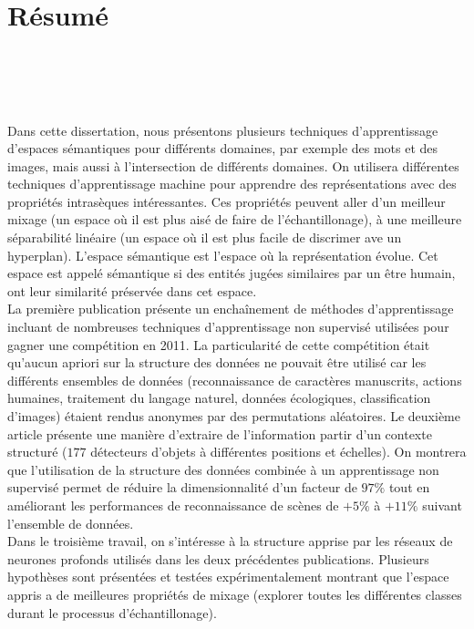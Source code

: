 \chapter*{R\'{e}sum\'{e}\\~~~~~~~~\\~~~~~~~~~~~}

\vspace{-2.8cm}

Dans cette dissertation, nous présentons plusieurs techniques d'apprentissage
d'espaces sémantiques pour différents domaines, par exemple des mots et des
images, mais aussi à l'intersection de différents domaines.  On utilisera
différentes techniques d'apprentissage machine pour apprendre des
représentations avec des propriétés intrasèques intéressantes. Ces propriétés
peuvent aller d'un meilleur mixage (un espace où il est plus aisé de faire de
l'échantillonage), à une meilleure séparabilité linéaire (un espace où il est
plus facile de discrimer ave un hyperplan). L'espace sémantique est l'espace où
la représentation évolue. Cet espace est appelé sémantique si des entités
jugées similaires par un être humain, ont leur similarité préservée dans cet
espace.
\\

\vspace{-0.2cm}
La première publication présente un enchaînement de méthodes d'apprentissage
incluant de nombreuses techniques d'apprentissage non supervisé utilisées pour
gagner une compétition en 2011. La particularité de cette compétition était
qu'aucun apriori sur la structure des données ne pouvait être utilisé car les
différents ensembles de données (reconnaissance de caractères manuscrits,
actions humaines, traitement du langage naturel, données écologiques,
classification d'images) étaient rendus anonymes par des permutations
aléatoires. Le deuxième article présente une manière d'extraire de l'information
partir d'un contexte structuré ($177$ détecteurs d'objets à différentes
positions et échelles). On montrera que l'utilisation de la structure des
données combinée à un apprentissage non supervisé permet de réduire la
dimensionnalité d'un facteur de $97\%$ tout en améliorant les performances de
reconnaissance de scènes de $+5\%$ à $+11\%$ suivant l'ensemble de données.
\\

\vspace{-0.2cm}
Dans le troisième travail, on s'intéresse à la structure apprise par les
réseaux de neurones profonds utilisés dans les deux précédentes publications.
Plusieurs hypothèses sont présentées et testées expérimentalement montrant que
l'espace appris a de meilleures propriétés de mixage (explorer toutes les
différentes classes durant le processus d'échantillonage).
\\

